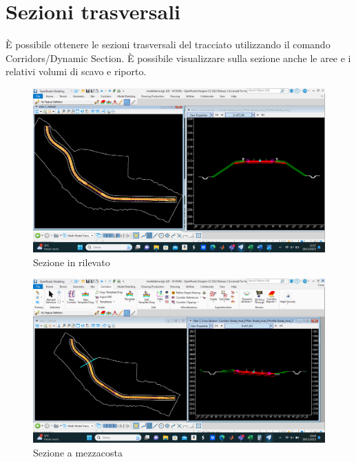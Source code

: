 \chapter{Sezioni trasversali}

È possibile ottenere le sezioni trasversali del tracciato utilizzando il comando Corridors/Dynamic Section. È possibile visualizzare sulla sezione anche le aree e i relativi volumi di scavo e riporto.

\begin{figure}[H]
    \includegraphics[width=\textwidth]{Figures/Sezione in rilevato.png}
      \caption{Sezione in rilevato}
      \label{Sezione in rilevato}
\end{figure}

\begin{figure}[H]
    \includegraphics[width=\textwidth]{Figures/Sezione a mezzacosta.png}
      \caption{Sezione a mezzacosta}
      \label{Sezione a mezzacosta}
\end{figure}

